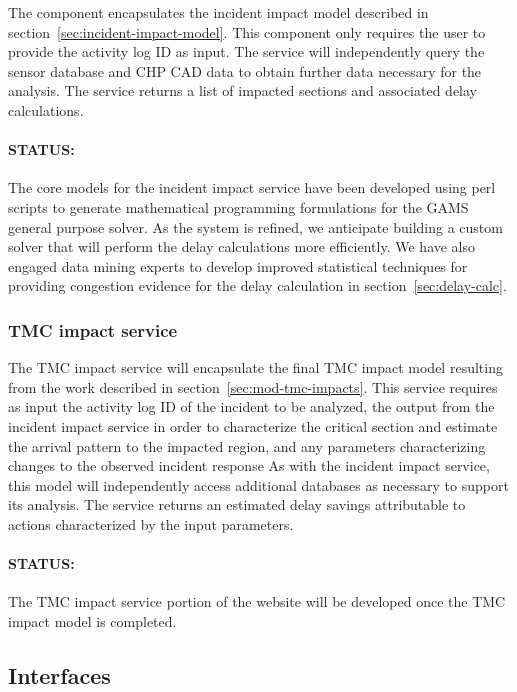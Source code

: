 \documentclass[12pt]{report}
\begin{document}
The component encapsulates the incident impact model described in
section~\ref{sec:incident-impact-model}.  This component only requires
the user to provide the activity log ID as input.  The service will
independently query the sensor database and CHP CAD data to obtain
further data necessary for the analysis.  The service returns a list
of impacted sections and associated delay calculations.

\paragraph{STATUS:} The core models for the incident impact service
have been developed using perl scripts to generate mathematical
programming formulations for the GAMS general purpose solver.  As the
system is refined, we anticipate building a custom solver that will
perform the delay calculations more efficiently.  We have also engaged
data mining experts to develop improved statistical techniques for
providing congestion evidence for the delay calculation in
section~\ref{sec:delay-calc}.


\subsubsection{TMC impact service}
The TMC impact service will encapsulate the final TMC impact model
resulting from the work described in
section~\ref{sec:mod-tmc-impacts}.  This service requires as input the
activity log ID of the incident to be analyzed, the output from the
incident impact service in order to characterize the critical section
and estimate the arrival pattern to the impacted region, and any
parameters characterizing changes to the observed incident response As
with the incident impact service, this model will independently access
additional databases as necessary to support its analysis.  The
service returns an estimated delay savings attributable to actions
characterized by the input parameters.

\paragraph{STATUS:} The TMC impact service portion of the website will
be developed once the TMC impact model is completed.



\subsection{Interfaces}
\label{sec:interfaces}
\end{document}

